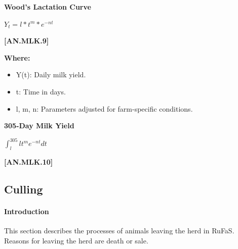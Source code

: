 \begin{refsection}
    \textbf{Wood's Lactation Curve}
    
            \begin{center}
                \(Y_t = l * t^{m} * e^{-nt}\)
            \end{center}
            \vspace{0.5cm}
            
            {\raggedleft \textbf{[AN.MLK.9]}\par}
            \vspace{0.5cm}

        \textbf{Where:}
        \vspace{0.2cm}
        
        \begin{itemize}
            \item Y(t): Daily milk yield.
            \item t: Time in days.
            \item l, m, n: Parameters adjusted for farm-specific conditions.
        \end{itemize}
    \vspace{0.5cm}

    \textbf{305-Day Milk Yield}
    
            \begin{center}
                \(\int_{l}^{305} lt^me^{-nt}dt\)
            \end{center}
            \vspace{0.5cm}
            
            {\raggedleft \textbf{[AN.MLK.10]}\par}
            \vspace{0.5cm}


\subsection{Culling} 

 
\paragraph{Introduction} This section describes the processes of animals leaving the herd in RuFaS. 
Reasons for leaving the herd are death or sale. 
\vspace{0.5cm}


\end{refsection}
